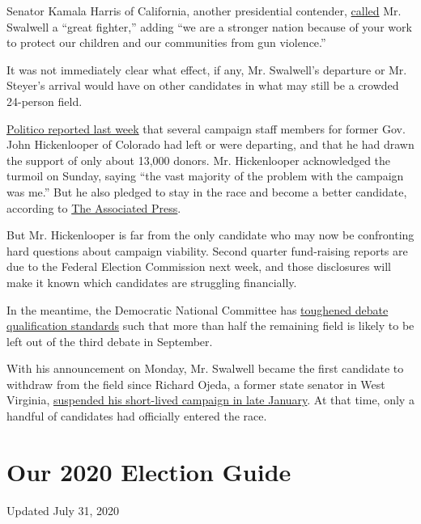 Senator Kamala Harris of California, another presidential contender,
\href{https://twitter.com/KamalaHarris/status/1148327721690370048}{called}
Mr. Swalwell a ``great fighter,'' adding ``we are a stronger nation
because of your work to protect our children and our communities from
gun violence.''

It was not immediately clear what effect, if any, Mr. Swalwell's
departure or Mr. Steyer's arrival would have on other candidates in what
may still be a crowded 24-person field.

\href{https://www.politico.com/story/2019/07/02/hickenlooper-2020-campaign-1395051}{Politico
reported last week} that several campaign staff members for former Gov.
John Hickenlooper of Colorado had left or were departing, and that he
had drawn the support of only about 13,000 donors. Mr. Hickenlooper
acknowledged the turmoil on Sunday, saying ``the vast majority of the
problem with the campaign was me.'' But he also pledged to stay in the
race and become a better candidate, according to
\href{https://apnews.com/610a9549881a4aec9acb011c6560694b}{The
Associated Press}.

But Mr. Hickenlooper is far from the only candidate who may now be
confronting hard questions about campaign viability. Second quarter
fund-raising reports are due to the Federal Election Commission next
week, and those disclosures will make it known which candidates are
struggling financially.

In the meantime, the Democratic National Committee has
\href{https://democrats.org/press/third-debate/}{toughened debate
qualification standards} such that more than half the remaining field is
likely to be left out of the third debate in September.

With his announcement on Monday, Mr. Swalwell became the first candidate
to withdraw from the field since Richard Ojeda, a former state senator
in West Virginia,
\href{https://www.facebook.com/RichardOjeda2020/posts/today-i-want-to-thank-from-the-bottom-of-my-heart-all-the-people-who-have-suppor/2329884223911515/}{suspended
his short-lived campaign in late January}. At that time, only a handful
of candidates had officially entered the race.

\hypertarget{our-2020-election-guide}{%
\section{Our 2020 Election Guide}\label{our-2020-election-guide}}

Updated July 31, 2020

